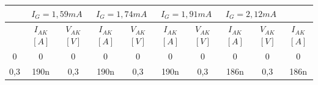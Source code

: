 \begin{center}
\begin{tabular}{cccccccccc}
\hline
\rowcolor[HTML]{FFFFC7} 
\multicolumn{2}{|c|}{\cellcolor[HTML]{FFFFC7}$I_G = 1,47 mA$}                                                              & \multicolumn{2}{c|}{\cellcolor[HTML]{FFFFC7}$I_G = 1,59 mA$}                                                              & \multicolumn{2}{c|}{\cellcolor[HTML]{FFFFC7}$I_G = 1,74mA$}                                                               & \multicolumn{2}{c|}{\cellcolor[HTML]{FFFFC7}$I_G = 1,91 mA$}                                                              & \multicolumn{2}{c|}{\cellcolor[HTML]{FFFFC7}$I_G = 2,12 mA$}                                                              \\ \hline
\rowcolor[HTML]{FFCE93} 
\multicolumn{1}{|c|}{\cellcolor[HTML]{FFCE93}$V_{AK}$ $[V]$} & \multicolumn{1}{c|}{\cellcolor[HTML]{DAE8FC}$I_{AK}$ $[A]$} & \multicolumn{1}{c|}{\cellcolor[HTML]{FFCE93}$V_{AK}$ $[V]$} & \multicolumn{1}{c|}{\cellcolor[HTML]{DAE8FC}$I_{AK}$ $[A]$} & \multicolumn{1}{c|}{\cellcolor[HTML]{FFCE93}$V_{AK}$ $[V]$} & \multicolumn{1}{c|}{\cellcolor[HTML]{DAE8FC}$I_{AK}$ $[A]$} & \multicolumn{1}{c|}{\cellcolor[HTML]{FFCE93}$V_{AK}$ $[V]$} & \multicolumn{1}{c|}{\cellcolor[HTML]{DAE8FC}$I_{AK}$ $[A]$} & \multicolumn{1}{c|}{\cellcolor[HTML]{FFCE93}$V_{AK}$ $[V]$} & \multicolumn{1}{c|}{\cellcolor[HTML]{DAE8FC}$I_{AK}$ $[A]$} \\ \hline
\multicolumn{1}{|c|}{0}                                      & \multicolumn{1}{c|}{0}                                      & \multicolumn{1}{c|}{0}                                      & \multicolumn{1}{c|}{0}                                      & \multicolumn{1}{c|}{0}                                      & \multicolumn{1}{c|}{0}                                      & \multicolumn{1}{c|}{0}                                      & \multicolumn{1}{c|}{0}                                      & \multicolumn{1}{c|}{0}                                      & \multicolumn{1}{c|}{0}                                      \\
\multicolumn{1}{|c|}{0,3}                                    & \multicolumn{1}{c|}{190n}                                   & \multicolumn{1}{c|}{0,3}                                    & \multicolumn{1}{c|}{190n}                                   & \multicolumn{1}{c|}{0,3}                                    & \multicolumn{1}{c|}{190n}                                   & \multicolumn{1}{c|}{0,3}                                    & \multicolumn{1}{c|}{186n}                                   & \multicolumn{1}{c|}{0,3}                                    & \multicolumn{1}{c|}{186n}                                   \\

\end{tabular}
\end{center}
